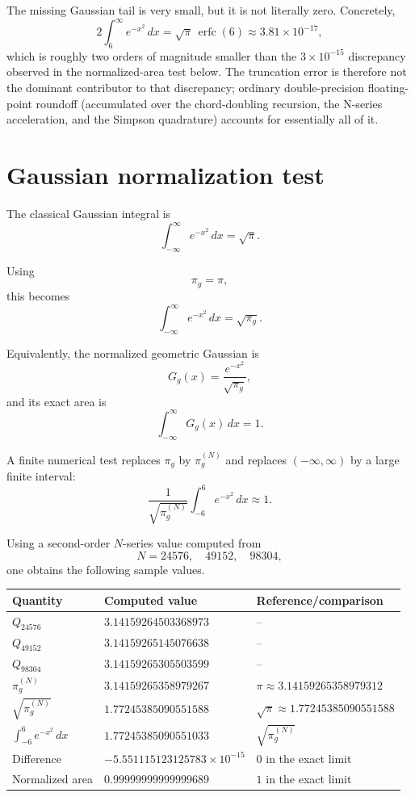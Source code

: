 \documentclass[11pt]{article}
\begin{document}
The missing Gaussian tail is very small, but it is not literally zero. Concretely,
\[
2\int_{6}^{\infty}e^{-x^2}\,dx = \sqrt{\pi}\,\operatorname{erfc}(6)
\approx 3.81\times10^{-17},
\]
which is roughly two orders of magnitude smaller than the
\(3\times10^{-15}\) discrepancy observed in the normalized-area test below.
The truncation error is therefore not the dominant contributor to that
discrepancy; ordinary double-precision floating-point roundoff (accumulated
over the chord-doubling recursion, the N-series acceleration, and the Simpson
quadrature) accounts for essentially all of it.

\section{Gaussian normalization test}
\label{sec:gaussian-test}

The classical Gaussian integral is
\[
\int_{-\infty}^{\infty}e^{-x^2}\,dx=\sqrt{\pi}.
\]

Using
\[
\pi_g=\pi,
\]
this becomes
\[
\int_{-\infty}^{\infty}e^{-x^2}\,dx=\sqrt{\pi_g}.
\]

Equivalently, the normalized geometric Gaussian is
\[
G_g(x)=\frac{e^{-x^2}}{\sqrt{\pi_g}},
\]
and its exact area is
\[
\int_{-\infty}^{\infty}G_g(x)\,dx=1.
\]

A finite numerical test replaces \(\pi_g\) by \(\pi_g^{(N)}\) and replaces
\((-\infty,\infty)\) by a large finite interval:
\[
\frac{1}{\sqrt{\pi_g^{(N)}}}
\int_{-6}^{6}e^{-x^2}\,dx
\approx 1.
\]

Using a second-order \(N\)-series value computed from
\[
N=24576,\quad 49152,\quad 98304,
\]
one obtains the following sample values.

\begin{center}
\begin{tabular}{lll}
\toprule
\textbf{Quantity} & \textbf{Computed value} & \textbf{Reference/comparison} \\
\midrule
\(Q_{24576}\) & \(3.14159264503368973\) & -- \\
\(Q_{49152}\) & \(3.14159265145076638\) & -- \\
\(Q_{98304}\) & \(3.14159265305503599\) & -- \\
\(\pi_g^{(N)}\) & \(3.14159265358979267\) & \(\pi\approx 3.14159265358979312\) \\
\(\sqrt{\pi_g^{(N)}}\) & \(1.77245385090551588\) & \(\sqrt{\pi}\approx 1.77245385090551588\) \\
\(\int_{-6}^{6}e^{-x^2}\,dx\) & \(1.77245385090551033\) & \(\sqrt{\pi_g^{(N)}}\) \\
Difference & \(-5.551115123125783\times 10^{-15}\) & \(0\) in the exact limit \\
Normalized area & \(0.99999999999999689\) & \(1\) in the exact limit \\
\bottomrule
\end{tabular}
\end{center}
\end{document}
